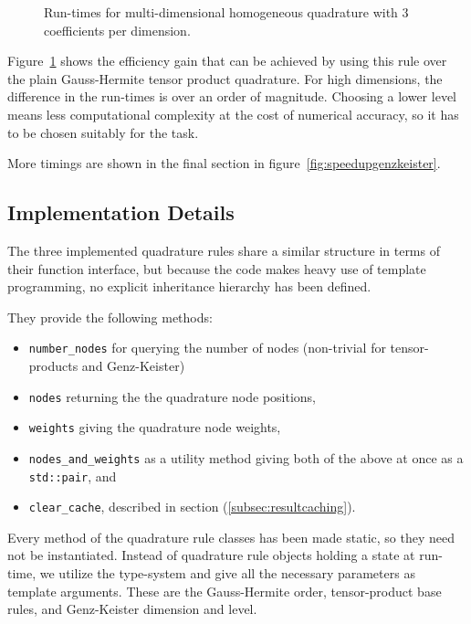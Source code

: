 \begin{figure}
  \center
  
  \caption{Run-times for multi-dimensional homogeneous quadrature with 3
    coefficients per dimension.}
  \label{fig:comparisonmultid}
\end{figure}

Figure~\ref{fig:comparisonmultid} shows the efficiency gain that can be achieved
by using this rule over the plain Gauss-Hermite tensor product quadrature.
For high dimensions, the difference in the run-times is over an order of
magnitude.
Choosing a lower level means less computational complexity at the cost of
numerical accuracy, so it has to be chosen suitably for the task.

More timings are shown in the final section in
figure~\ref{fig:speedupgenzkeister}.


\subsection{Implementation Details}

The three implemented quadrature rules share a similar structure in terms of
their function interface, but because the code makes heavy use of template
programming, no explicit inheritance hierarchy has been defined.

They provide the following methods:
\begin{itemize}
  \item \texttt{number\_nodes} for querying the number of nodes (non-trivial for
    tensor-products and Genz-Keister)
  \item \texttt{nodes} returning the the quadrature node positions,
  \item \texttt{weights} giving the quadrature node weights,
  \item \texttt{nodes\_and\_weights} as a utility method giving both of the
    above at once as a \texttt{std::pair}, and
  \item \texttt{clear\_cache}, described in section
    (\ref{subsec:resultcaching}).
\end{itemize}

Every method of the quadrature rule classes has been made static, so they need
not be instantiated.
Instead of quadrature rule objects holding a state at run-time, we utilize the
type-system and give all the necessary parameters as template arguments.
These are the Gauss-Hermite order, tensor-product base rules, and Genz-Keister
dimension and level.

